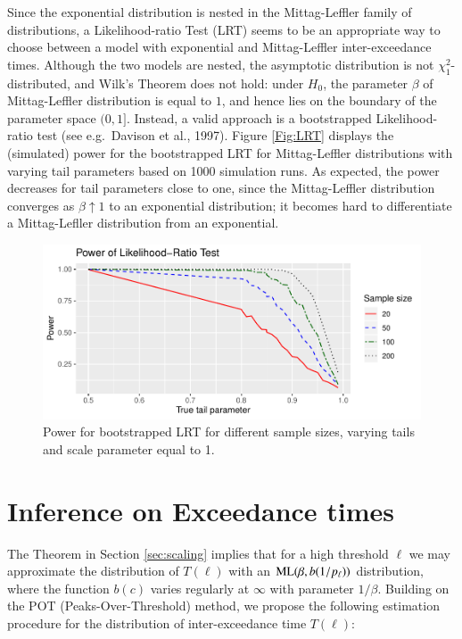 \documentclass[]{elsarticle} %
\begin{document}
Since the exponential distribution is nested in the Mittag-Leffler
family of distributions, a Likelihood-ratio Test (LRT) seems to be an
appropriate way to choose between a model with exponential and
Mittag-Leffler inter-exceedance times. Although the two models are
nested, the asymptotic distribution is not \(\chi^2_1\)-distributed, and
Wilk's Theorem does not hold: under \(H_0\), the parameter \(\beta\) of
Mittag-Leffler distribution is equal to \(1\), and hence lies on the
boundary of the parameter space \((0,1]\). Instead, a valid approach is
a bootstrapped Likelihood-ratio test (see e.g.~Davison et al., 1997).
Figure \ref{Fig:LRT} displays the (simulated) power for the bootstrapped
LRT for Mittag-Leffler distributions with varying tail parameters based
on 1000 simulation runs. As expected, the power decreases for tail
parameters close to one, since the Mittag-Leffler distribution converges
as \(\beta \uparrow 1\) to an exponential distribution; it becomes hard
to differentiate a Mittag-Lefller distribution from an exponential.

\begin{figure}

{\centering \includegraphics[width=0.9\linewidth]{article_springer_files/figure-latex/LRT_power-1} 

}

\caption{\label{Fig:LRT} Power for bootstrapped LRT for different sample sizes, varying tails and scale parameter equal to 1.}\label{fig:LRT_power}
\end{figure}

\hypertarget{inference-on-exceedance-times}{%
\section{Inference on Exceedance
times}\label{inference-on-exceedance-times}}

The Theorem in Section \ref{sec:scaling} implies that for a high
threshold \(\ell\) we may approximate the distribution of \(T(\ell)\)
with an \({\rm ML}(\beta, b(1/p_{\ell}))\) distribution, where the
function \(b(c)\) varies regularly at \(\infty\) with parameter
\(1/\beta\). Building on the POT (Peaks-Over-Threshold) method, we
propose the following estimation procedure for the distribution of
inter-exceedance time \(T(\ell)\):
\end{document}
